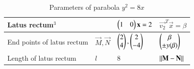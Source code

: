 \documentclass[journal,12pt,twocolumn]{IEEEtran}
\begin{document}
\begin{table}[!ht]
\begin{center}
\begin{tabular}{ | m{1.4cm} | m{1.0cm}| m{2.4cm} | m{2.3cm} | }
\hline
Latus \newline rectum$^{3}$ & & $\begin{pmatrix}1 & 0\end{pmatrix}\mathbf{x}=2$ & $\vec{v_2}^T\vec{x}=\beta$\\
\hline
End \newline points \newline of latus \newline rectum & $\vec{M},\vec{N}$ & $\begin{pmatrix}2\\4\end{pmatrix},\begin{pmatrix}2\\-4\end{pmatrix}$ & $\begin{pmatrix}\beta \\ \pm y(\beta)\end{pmatrix}$ \\
\hline
Length \newline of latus \newline rectum & $l$ & 8 & $\left\lVert\mathbf{M}-\mathbf{N}\right\rVert$\\
\hline
\end{tabular}
\end{center}
\caption{Parameters of parabola $y^2=8x$}
\label{tab:table1}
\end{table}
\end{document}
